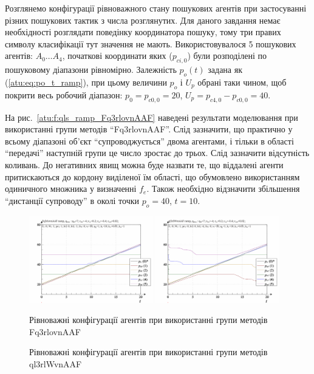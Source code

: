 \documentclass[a4paper,13pt]{atuaref}
\begin{document}
Розглянемо конфігурації рівноважного стану пошукових агентів при застосуванні
різних пошукових тактик з числа розглянутих. Для даного завдання немає
необхідності розглядати поведінку координатора пошуку, тому три правих символу
класифікації тут значення не мають.
Використовувалося 5 пошукових агентів: $ A_0 \ldots A_4 $, початкові
координати яких ($ p_ {ci,0} $) були розподілені по пошуковому діапазони
рівномірно. Залежність $ p_o (t) $ задана як (\ref{atu:eq:po_t_ramp}), при
цьому величини $ p_o $ і $ U_p $ обрані таки чином, щоб покрити весь робочий
діапазон: $ p_0 = p_{c0,0} = 20 $, $ U_p = p_ {c4,0} - p_ {c0,0} = 40 $.


На рис.~\ref{atu:f:qls_ramp_Fq3rlovnAAF} наведені результати моделювання при використанні групи методів
``Fq3rlovnAAF''. Слід зазначити, що практично у всьому діапазоні об'єкт
``супроводжується'' двома агентами, і тільки в області ``передачі'' наступній
групи це число зростає до трьох. Слід зазначити відсутність коливань. До
негативних явищ можна буде назвати те, що віддалені агенти притискаються до
кордону виділеної їм області, що обумовлено використанням одиничного множника у
визначенні $ f_e $. Також необхідно відзначити збільшення
``дистанції супроводу'' в околі точки $ p_o = 40 $, $ t = 10 $.

\begin{figure}[htb!]
    \includegraphics[width=0.48\textwidth]{p3/p/ramp/qls-p_t_pi_Fq3rlovnAAF_ramp.png} \hfill
    \includegraphics[width=0.48\textwidth]{p3/p/ramp/qls-p_t_pi_ql3rlWvnAAF_ramp.png}
  \\
  \parbox[t]{0.48\textwidth} {
    \caption{Рівноважні конфігурації агентів при використанні групи методів  Fq3rlovnAAF}
    \label{atu:f:qls_ramp_Fq3rlovnAAF}
  }
  \hfill
  \parbox[t]{0.48\textwidth} {
    \caption{Рівноважні конфігурації агентів при використанні групи методів ql3rlWvnAAF}
    \label{atu:f:qls_ramp_ql3rlWvnAAF}
  }
\end{figure}
\end{document}
